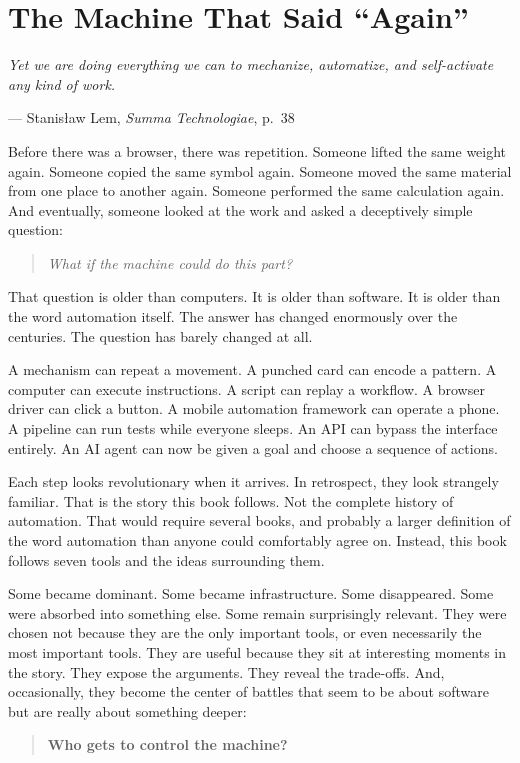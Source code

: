 \documentclass[11pt,twoside]{book}
\providecommand{\epigraphlem}[2]{%
  \begin{flushright}\begin{minipage}{0.72\textwidth}\raggedleft
  \itshape #1\par\vspace{0.4em}\normalfont\small --- #2
  \end{minipage}\end{flushright}\vspace{1.2em}}
\begin{document}
\chapter*{The Machine That Said ``Again''}

\epigraphlem{Yet we are doing everything we can to mechanize, automatize, and self-activate any kind of work.}{Stanisław Lem, \textit{Summa Technologiae}, p.~38}


Before there was a browser, there was repetition.
Someone lifted the same weight again. Someone copied the same symbol again. Someone moved the same material from one place to another again. Someone performed the same calculation again.
And eventually, someone looked at the work and asked a deceptively simple question:
\begin{quote}
\emph{What if the machine could do this part?}
\end{quote}
That question is older than computers.
It is older than software.
It is older than the word automation itself.
The answer has changed enormously over the centuries. The question has barely changed at all.

A mechanism can repeat a movement. A punched card can encode a pattern. A computer can execute instructions. A script can replay a workflow. A browser driver can click a button. A mobile automation framework can operate a phone. A pipeline can run tests while everyone sleeps. An API can bypass the interface entirely. An AI agent can now be given a goal and choose a sequence of actions.

Each step looks revolutionary when it arrives.
In retrospect, they look strangely familiar.
That is the story this book follows.
Not the complete history of automation. That would require several books, and probably a larger definition of the word automation than anyone could comfortably agree on.
Instead, this book follows seven tools and the ideas surrounding them.

Some became dominant. Some became infrastructure. Some disappeared. Some were absorbed into something else. Some remain surprisingly relevant.
They were chosen not because they are the only important tools, or even necessarily the most important tools.
They are useful because they sit at interesting moments in the story.
They expose the arguments.
They reveal the trade-offs.
And, occasionally, they become the center of battles that seem to be about software but are really about something deeper:
\begin{quote}
\textbf{Who gets to control the machine?}
\end{quote}
\end{document}
